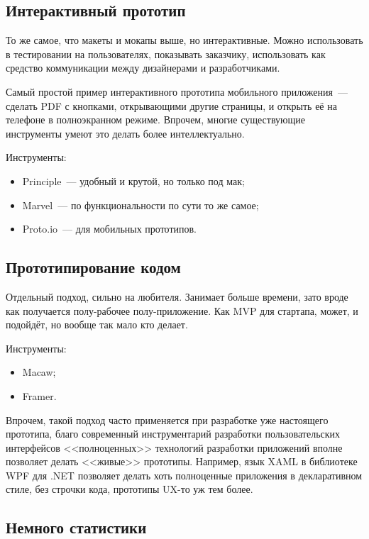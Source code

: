 \documentclass{../../text-style}
\begin{document}
\subsection{Интерактивный прототип}

То же самое, что макеты и мокапы выше, но интерактивные. Можно использовать в тестировании на пользователях, показывать заказчику, использовать как средство коммуникации между дизайнерами и разработчиками.

Самый простой пример интерактивного прототипа мобильного приложения~--- сделать PDF с кнопками, открывающими другие страницы, и открыть её на телефоне в полноэкранном режиме. Впрочем, многие существующие инструменты умеют это делать более интеллектуально. 

Инструменты:

\begin{itemize}
    \item Principle~--- удобный и крутой, но только под мак;
    \item Marvel~--- по функциональности по сути то же самое;
    \item Proto.io~--- для мобильных прототипов.
\end{itemize}

\subsection{Прототипирование кодом}

Отдельный подход, сильно на любителя. Занимает больше времени, зато вроде как получается полу-рабочее полу-приложение. Как MVP для стартапа, может, и подойдёт, но вообще так мало кто делает. 

Инструменты:

\begin{itemize}
    \item Macaw;
    \item Framer.
\end{itemize}

Впрочем, такой подход часто применяется при разработке уже настоящего прототипа, благо современный инструментарий разработки пользовательских интерфейсов <<полноценных>> технологий разработки приложений вполне позволяет делать <<живые>> прототипы. Например, язык XAML в библиотеке WPF для .NET позволяет делать хоть полноценные приложения в декларативном стиле, без строчки кода, прототипы UX-то уж тем более.

\subsection{Немного статистики}
\end{document}
